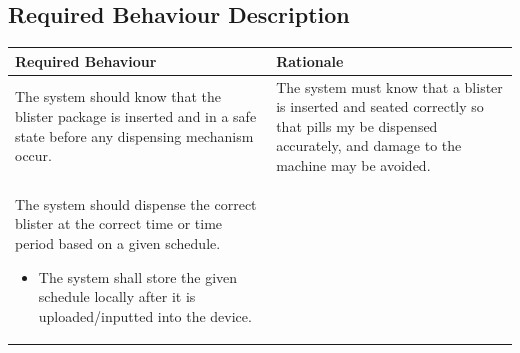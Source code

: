 \documentclass[12pt,titlepage]{article}
\begin{document}
\pagebreak
\subsection{Required Behaviour Description}

\begin{table}[ht!]
\begin{center}
\begin{adjustbox}{max width=\textwidth}
\small
\begin{tabular}{|p{}|p{}|}
 \hline
 \textbf{Required Behaviour} & \textbf{Rationale} \\
 \hline
 The system should know that the blister package is inserted and in a safe state before any dispensing mechanism occur.  & The system must know that a blister is inserted and seated correctly so that pills my be dispensed accurately, and damage to the machine may be avoided.\\
 \hline 
 The system should dispense the correct blister at the correct time or time period based on a given schedule.
 \begin{itemize}
     \item The system shall store the given schedule locally after it is uploaded/inputted into the device.
 \end{itemize} &


\end{tabular}
\end{adjustbox}
\end{center}
\end{table}
\end{document}

